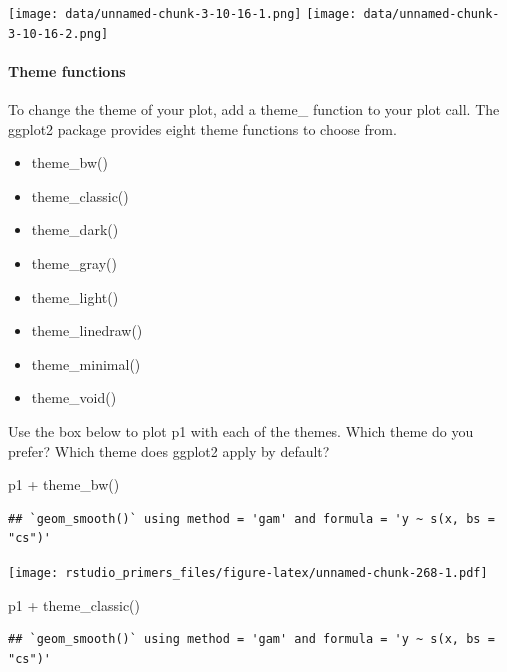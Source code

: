 \documentclass[
]{article}
\newenvironment{Shaded}{\begin{snugshade}}{\end{snugshade}}
\newcommand{\FunctionTok}[1]{\textcolor[rgb]{0.00,0.00,0.00}{#1}}
\newcommand{\NormalTok}[1]{#1}
\newcommand{\SpecialCharTok}[1]{\textcolor[rgb]{0.00,0.00,0.00}{#1}}
\providecommand{\tightlist}{%
  \setlength{\itemsep}{0pt}\setlength{\parskip}{0pt}}
\begin{document}
\texttt{[image: data/unnamed-chunk-3-10-16-1.png]}
\texttt{[image: data/unnamed-chunk-3-10-16-2.png]}

\hypertarget{theme-functions}{%
\paragraph{Theme functions}\label{theme-functions}}

To change the theme of your plot, add a theme\_ function to your plot
call. The ggplot2 package provides eight theme functions to choose from.

\begin{itemize}
\tightlist
\item
  theme\_bw()
\item
  theme\_classic()
\item
  theme\_dark()
\item
  theme\_gray()
\item
  theme\_light()
\item
  theme\_linedraw()
\item
  theme\_minimal()
\item
  theme\_void()
\end{itemize}

Use the box below to plot p1 with each of the themes. Which theme do you
prefer? Which theme does ggplot2 apply by default?

\begin{Shaded}
\begin{Highlighting}[]
\NormalTok{p1 }\SpecialCharTok{+} \FunctionTok{theme\_bw}\NormalTok{()}
\end{Highlighting}
\end{Shaded}

\begin{verbatim}
## `geom_smooth()` using method = 'gam' and formula = 'y ~ s(x, bs = "cs")'
\end{verbatim}

\texttt{[image: rstudio\_primers\_files/figure-latex/unnamed-chunk-268-1.pdf]}

\begin{Shaded}
\begin{Highlighting}[]
\NormalTok{p1 }\SpecialCharTok{+} \FunctionTok{theme\_classic}\NormalTok{()}
\end{Highlighting}
\end{Shaded}

\begin{verbatim}
## `geom_smooth()` using method = 'gam' and formula = 'y ~ s(x, bs = "cs")'
\end{verbatim}
\end{document}
